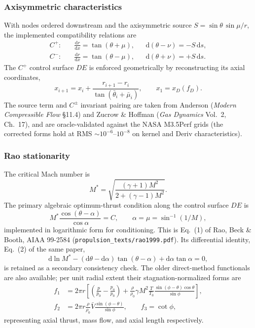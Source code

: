 \documentclass[11pt]{article}
\newcommand{\code}[1]{\texttt{#1}}
\begin{document}
\subsubsection{Axisymmetric characteristics}

With nodes ordered downstream and the axisymmetric source
$S=\sin\theta\,\sin\mu/r$, the implemented compatibility relations are
\begin{align}
C^{+}:&\quad \frac{\mathrm{d}r}{\mathrm{d}x}=\tan(\theta+\mu),
&& \mathrm{d}(\theta-\nu)=-S\,\mathrm{d}s, \\[2pt]
C^{-}:&\quad \frac{\mathrm{d}r}{\mathrm{d}x}=\tan(\theta-\mu),
&& \mathrm{d}(\theta+\nu)=+S\,\mathrm{d}s .
\end{align}
The $C^{+}$ control surface $DE$ is enforced geometrically by reconstructing
its axial coordinates,
\begin{equation}
x_{i+1}=x_i+\frac{r_{i+1}-r_i}{\tan(\bar\theta_i+\bar\mu_i)},
\qquad x_1=x_D(f_D) .
\end{equation}
The source term and $C^{\pm}$ invariant pairing are taken from Anderson
(\emph{Modern Compressible Flow} \S11.4) and Zucrow \& Hoffman (\emph{Gas
Dynamics} Vol.\ 2, Ch.\ 17), and are oracle-validated against the NASA
M3.5Perf grids (the corrected forms hold at RMS $\sim 10^{-6}$--$10^{-8}$ on
kernel and Deriv characteristics).

\subsubsection{Rao stationarity}

The critical Mach number is
\begin{equation}
M^*=\sqrt{\frac{(\gamma+1)M^2}{2+(\gamma-1)M^2}} .
\end{equation}
The primary algebraic optimum-thrust condition along the control surface $DE$
is
\begin{equation}
M^*\frac{\cos(\theta-\alpha)}{\cos\alpha}=C,
\qquad \alpha=\mu=\sin^{-1}(1/M),
\label{eq:rao1}
\end{equation}
implemented in logarithmic form for conditioning. This is Eq.~(1) of Rao,
Beck \& Booth, AIAA 99-2584 (\code{propulsion\_texts/rao1999.pdf}). Its
differential identity, Eq.~(2) of the same paper,
\begin{equation}
\mathrm{d}\ln M^*-(\mathrm{d}\theta-\mathrm{d}\alpha)\tan(\theta-\alpha)
+\mathrm{d}\alpha\tan\alpha=0,
\end{equation}
is retained as a secondary consistency check. The older direct-method
functionals are also available; per unit radial extent their
stagnation-normalized forms are
\begin{align}
f_1&=2\pi r\left[\left(\frac{p}{p_0}-\frac{p_a}{p_0}\right)
+\frac{\rho}{\rho_0}\gamma M^2\frac{T}{T_0}
\frac{\sin(\phi-\theta)\cos\theta}{\sin\phi}\right], \\
f_2&=2\pi r\frac{\rho}{\rho_0}\bar V\frac{\sin(\phi-\theta)}{\sin\phi},
\qquad
f_3=\cot\phi,
\end{align}
representing axial thrust, mass flow, and axial length respectively.
\end{document}
